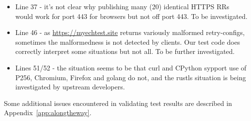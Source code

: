 \begin{itemize}
    \item Line 37 - it's not clear why publishing many (20) identical HTTPS RRs
        would work for port 443 for browsers but not off port 443. To be
        investigated.

    \item Line 46 - as \url{https://myechtest.site} returns variously malformed
        retry-configs, sometimes the malformedness is not detected by clients.
        Our test code does correctly interpret some situations but not all.
        To be further investigated.

    \item Lines 51/52 - the situation seems to be that curl and CPython sypport
        use of P256, Chromium, Firefox and golang do not, and the rustls
        situation is being investigated by upstream developers.

\end{itemize}

Some additional issues encountered in validating test results are described
in Appendix~\ref{app:alongtheway}.

